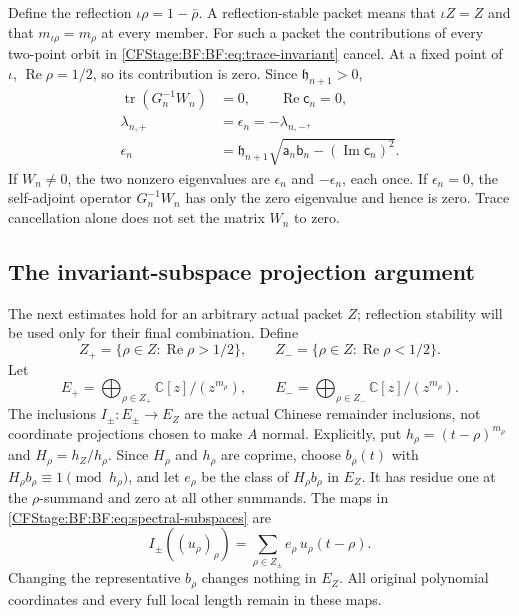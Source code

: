 Define the reflection \(\iota\rho=1-\bar\rho\).
A reflection-stable packet means that \(\iota Z=Z\) and that
\(m_{\iota\rho}=m_\rho\) at every member.
For such a packet the contributions of every two-point orbit in
\eqref{CFStage:BF:BF:eq:trace-invariant} cancel.  At a fixed point of \(\iota\),
\(\operatorname{Re}\rho=1/2\), so its contribution is zero.
Since \(\mathfrak h_{n+1}>0\),
\begin{equation}
\begin{split}
\operatorname{tr}(G_n^{-1}W_n)&=0,
\qquad\operatorname{Re}\mathsf c_n=0,\\
\lambda_{n,+}&=\epsilon_n=-\lambda_{n,-},\\
\epsilon_n
 &=\mathfrak h_{n+1}
   \sqrt{\mathsf a_n\mathsf b_n-
                 (\operatorname{Im}\mathsf c_n)^2}.
\end{split}
\tag{BF.25}\label{CFStage:BF:BF:eq:reflection-trace}
\end{equation}
If \(W_n\ne0\), the two nonzero eigenvalues are
\(\epsilon_n\) and \(-\epsilon_n\), each once.
If \(\epsilon_n=0\), the self-adjoint operator \(G_n^{-1}W_n\)
has only the zero eigenvalue and hence is zero.  Trace cancellation
alone does not set the matrix \(W_n\) to zero.

\subsection{The invariant-subspace projection argument}
\label{CFStage:BF:BF:projection-proof}

The next estimates hold for an arbitrary actual packet \(Z\);
reflection stability will be used only for their final combination.
Define
\[
Z_+=\{\rho\in Z:\operatorname{Re}\rho>1/2\},\qquad
Z_-=\{\rho\in Z:\operatorname{Re}\rho<1/2\}.
\]
Let
\begin{equation}
E_+=\bigoplus_{\rho\in Z_+}\mathbb C[z]/(z^{m_\rho}),
\qquad
E_-=\bigoplus_{\rho\in Z_-}\mathbb C[z]/(z^{m_\rho}).
\tag{BF.26}\label{CFStage:BF:BF:eq:spectral-subspaces}
\end{equation}
The inclusions \(I_\pm:E_\pm\to E_Z\) are the actual Chinese
remainder inclusions, not coordinate projections chosen to make
\(A\) normal.  Explicitly, put \(h_\rho=(t-\rho)^{m_\rho}\) and
\(H_\rho=h_Z/h_\rho\).  Since \(H_\rho\) and \(h_\rho\) are coprime,
choose \(b_\rho(t)\) with \(H_\rho b_\rho\equiv1\pmod{h_\rho}\),
and let \(e_\rho\) be the class of \(H_\rho b_\rho\) in \(E_Z\).
It has residue one at the \(\rho\)-summand and zero at all other
summands.  The maps in \eqref{CFStage:BF:BF:eq:spectral-subspaces} are
\[
I_\pm((u_\rho)_\rho)
 =\sum_{\rho\in Z_\pm}e_\rho\,u_\rho(t-\rho).
\]
Changing the representative \(b_\rho\) changes nothing in \(E_Z\).
All original polynomial coordinates and every full local length
remain in these maps.


